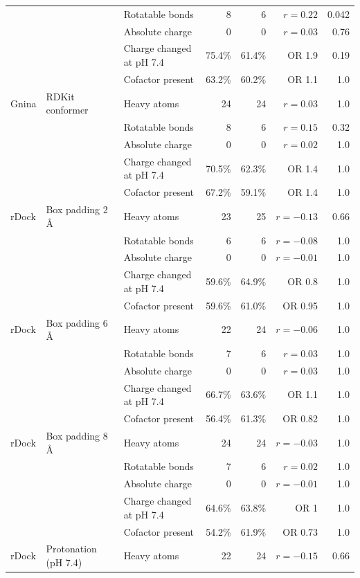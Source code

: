 \begin{longtable}{lllrrrr}
 &  & Rotatable bonds & 8 & 6 & $r = 0.22$ & 0.042 \\
 &  & Absolute charge & 0 & 0 & $r = 0.03$ & 0.76 \\
 &  & Charge changed at pH 7.4 & 75.4\% & 61.4\% & OR 1.9 & 0.19 \\
 &  & Cofactor present & 63.2\% & 60.2\% & OR 1.1 & 1.0 \\
\addlinespace
Gnina & RDKit conformer & Heavy atoms & 24 & 24 & $r = 0.03$ & 1.0 \\
 &  & Rotatable bonds & 8 & 6 & $r = 0.15$ & 0.32 \\
 &  & Absolute charge & 0 & 0 & $r = 0.02$ & 1.0 \\
 &  & Charge changed at pH 7.4 & 70.5\% & 62.3\% & OR 1.4 & 1.0 \\
 &  & Cofactor present & 67.2\% & 59.1\% & OR 1.4 & 1.0 \\
\addlinespace
rDock & Box padding 2 \AA{} & Heavy atoms & 23 & 25 & $r = -0.13$ & 0.66 \\
 &  & Rotatable bonds & 6 & 6 & $r = -0.08$ & 1.0 \\
 &  & Absolute charge & 0 & 0 & $r = -0.01$ & 1.0 \\
 &  & Charge changed at pH 7.4 & 59.6\% & 64.9\% & OR 0.8 & 1.0 \\
 &  & Cofactor present & 59.6\% & 61.0\% & OR 0.95 & 1.0 \\
\addlinespace
rDock & Box padding 6 \AA{} & Heavy atoms & 22 & 24 & $r = -0.06$ & 1.0 \\
 &  & Rotatable bonds & 7 & 6 & $r = 0.03$ & 1.0 \\
 &  & Absolute charge & 0 & 0 & $r = 0.03$ & 1.0 \\
 &  & Charge changed at pH 7.4 & 66.7\% & 63.6\% & OR 1.1 & 1.0 \\
 &  & Cofactor present & 56.4\% & 61.3\% & OR 0.82 & 1.0 \\
\addlinespace
rDock & Box padding 8 \AA{} & Heavy atoms & 24 & 24 & $r = -0.03$ & 1.0 \\
 &  & Rotatable bonds & 7 & 6 & $r = 0.02$ & 1.0 \\
 &  & Absolute charge & 0 & 0 & $r = -0.01$ & 1.0 \\
 &  & Charge changed at pH 7.4 & 64.6\% & 63.8\% & OR 1 & 1.0 \\
 &  & Cofactor present & 54.2\% & 61.9\% & OR 0.73 & 1.0 \\
\addlinespace
rDock & Protonation (pH 7.4) & Heavy atoms & 22 & 24 & $r = -0.15$ & 0.66 \\

\end{longtable}
